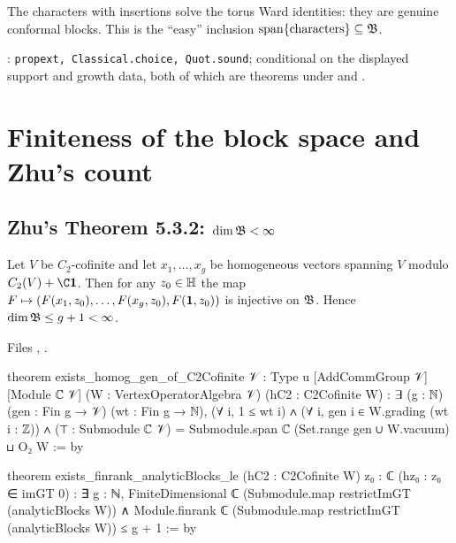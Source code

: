 \begin{physics}
The characters with insertions solve the torus Ward identities: they are genuine conformal blocks. This is the ``easy''
inclusion $\mathrm{span}\{\text{characters}\}\subseteq\mathfrak{B}$.
\end{physics}

\begin{status}
\allowbreak{}: \texttt{propext, Classical.choice, Quot.sound}; conditional on the displayed
support and growth data, both of which are theorems under  and .
\end{status}

\section{Finiteness of the block space and Zhu's count}\label{l15:sec:finite}

\subsection{Zhu's Theorem 5.3.2: \texorpdfstring{$\dim\mathfrak{B}<\infty$}{dim B finite}}

\begin{theorem}\label{l15:thm:532}
Let $V$ be $C_2$-cofinite and let $x_1,\dots,x_g$ be homogeneous vectors spanning $V$ modulo $C_2(V)+\C\lfifteenvac$. Then
for any $z_0\in\mathbb{H}$ the map $F\mapsto(F(x_1,z_0),\dots,F(x_g,z_0),F(\mathbf{1},z_0))$ is injective on $\mathfrak{B}$.
Hence $\dim\mathfrak{B}\le g+1<\infty$.
\end{theorem}
\noindent Files ,
.
\begin{leancode}
theorem exists_homog_gen_of_C2Cofinite {𝒱 : Type u} [AddCommGroup 𝒱] [Module ℂ 𝒱]
    (W : VertexOperatorAlgebra 𝒱) (hC2 : C2Cofinite W) :
    ∃ (g : ℕ) (gen : Fin g → 𝒱) (wt : Fin g → ℕ),
      (∀ i, 1 ≤ wt i) ∧ (∀ i, gen i ∈ W.grading (wt i : ℤ)) ∧
      (⊤ : Submodule ℂ 𝒱) = Submodule.span ℂ (Set.range gen ∪ {W.vacuum}) ⊔ O₂ W := by

theorem exists_finrank_analyticBlocks_le (hC2 : C2Cofinite W) {z₀ : ℂ} (hz₀ : z₀ ∈ imGT 0) :
    ∃ g : ℕ, FiniteDimensional ℂ (Submodule.map restrictImGT (analyticBlocks W)) ∧
      Module.finrank ℂ (Submodule.map restrictImGT (analyticBlocks W)) ≤ g + 1 := by
\end{leancode}

